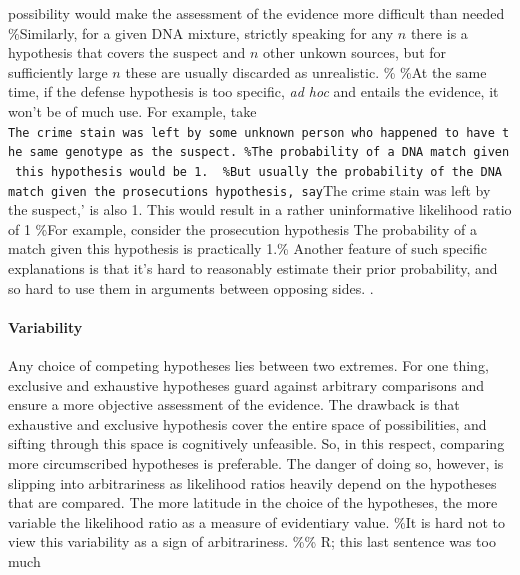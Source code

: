 \documentclass[10pt,dvipsnames,enabledeprecatedfontcommands]{scrartcl}
\let\oldparagraph\paragraph
\renewcommand{\paragraph}[1]{\oldparagraph{#1}\mbox{}}
\begin{document}
possibility would make the assessment of the evidence more difficult
than needed \%Similarly, for a given DNA mixture, strictly speaking for
any \(n\) there is a hypothesis that covers the suspect and \(n\) other
unkown sources, but for sufficiently large \(n\) these are usually
discarded as unrealistic. \% \%At the same time, if the defense
hypothesis is too specific, \textit{ad hoc} and entails the evidence, it
won't be of much use. For example, take
\texttt{The\ crime\ stain\ was\ left\ by\ some\ unknown\ person\ who\ happened\ to\ have\ the\ same\ genotype\ as\ the\ suspect.\textquotesingle{}\ \%The\ probability\ of\ a\ DNA\ match\ given\ this\ hypothesis\ would\ be\ 1.\ \ \%But\ usually\ the\ probability\ of\ the\ DNA\ match\ given\ the\ prosecution\textquotesingle{}s\ hypothesis,\ say}The
crime stain was left by the suspect,' is also 1. This would result in a
rather uninformative likelihood ratio of 1 \%For example, consider the
prosecution hypothesis The probability of a match given this hypothesis
is practically 1.\% Another feature of such specific explanations is
that it's hard to reasonably estimate their prior probability, and so
hard to use them in arguments between opposing sides.
\citep{evett2000MoreHierarchyPropositions}.

\paragraph{Variability}

Any choice of competing hypotheses lies between two extremes. For one
thing, exclusive and exhaustive hypotheses guard against arbitrary
comparisons and ensure a more objective assessment of the evidence. The
drawback is that exhaustive and exclusive hypothesis cover the entire
space of possibilities, and sifting through this space is cognitively
unfeasible. So, in this respect, comparing more circumscribed hypotheses
is preferable. The danger of doing so, however, is slipping into
arbitrariness as likelihood ratios heavily depend on the hypotheses that
are compared. The more latitude in the choice of the hypotheses, the
more variable the likelihood ratio as a measure of evidentiary value.
\%It is hard not to view this variability as a sign of arbitrariness.
\%\% R; this last sentence was too much
\end{document}
